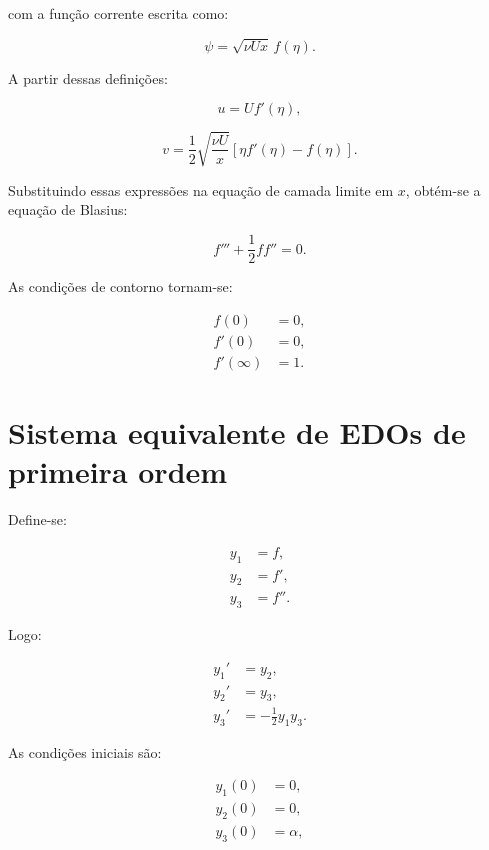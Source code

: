 \documentclass[12pt,a4paper]{article}
\begin{document}
com a função corrente escrita como:

\begin{equation}
    \psi = \sqrt{\nu U x}\,f(\eta).
\end{equation}

A partir dessas definições:

\begin{equation}
    u = U f'(\eta),
\end{equation}

\begin{equation}
    v = \frac{1}{2}\sqrt{\frac{\nu U}{x}}\left[\eta f'(\eta)-f(\eta)\right].
\end{equation}

Substituindo essas expressões na equação de camada limite em $x$, obtém-se a equação de Blasius:

\begin{equation}
    \boxed{f''' + \frac{1}{2}f f'' = 0.}
\end{equation}

As condições de contorno tornam-se:

\begin{align}
    f(0) &= 0, \\
    f'(0) &= 0, \\
    f'(\infty) &= 1.
\end{align}

\section{Sistema equivalente de EDOs de primeira ordem}

Define-se:

\begin{align}
    y_1 &= f, \\
    y_2 &= f', \\
    y_3 &= f''.
\end{align}

Logo:

\begin{align}
    y_1' &= y_2, \\
    y_2' &= y_3, \\
    y_3' &= -\frac{1}{2}y_1y_3.
\end{align}

As condições iniciais são:

\begin{align}
    y_1(0) &= 0, \\
    y_2(0) &= 0, \\
    y_3(0) &= \alpha,
\end{align}
\end{document}
